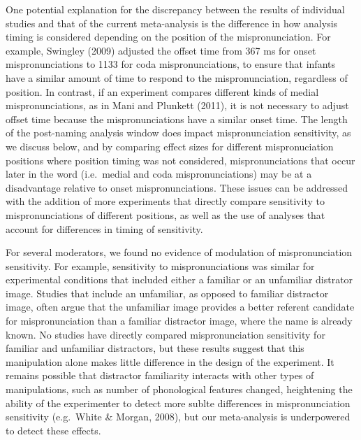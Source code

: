 \documentclass[man]{apa6}
\begin{document}
One potential explanation for the discrepancy between the results of individual studies and that of the current meta-analysis is the difference in how analysis timing is considered depending on the position of the mispronunciation. For example, Swingley (2009) adjusted the offset time from 367 ms for onset mispronunciations to 1133 for coda mispronunciations, to ensure that infants have a similar amount of time to respond to the mispronunciation, regardless of position. In contrast, if an experiment compares different kinds of medial mispronunciations, as in Mani and Plunkett (2011), it is not necessary to adjust offset time because the mispronunciations have a similar onset time. The length of the post-naming analysis window does impact mispronunciation sensitivity, as we discuss below, and by comparing effect sizes for different mispronuciation positions where position timing was not considered, mispronunciations that occur later in the word (i.e.~medial and coda mispronunciations) may be at a disadvantage relative to onset mispronunciations. These issues can be addressed with the addition of more experiments that directly compare sensitivity to mispronunciations of different positions, as well as the use of analyses that account for differences in timing of sensitivity.

For several moderators, we found no evidence of modulation of mispronunciation sensitivity. For example, sensitivity to mispronunciations was similar for experimental conditions that included either a familiar or an unfamiliar distrator image. Studies that include an unfamiliar, as opposed to familiar distractor image, often argue that the unfamiliar image provides a better referent candidate for mispronunciation than a familiar distractor image, where the name is already known. No studies have directly compared mispronunciation sensitivity for familiar and unfamiliar distractors, but these results suggest that this manipulation alone makes little difference in the design of the experiment. It remains possible that distractor familiarity interacts with other types of manipulations, such as number of phonological features changed, heightening the ability of the experimenter to detect more sublte differences in mispronunciation sensitivity (e.g.~White \& Morgan, 2008), but our meta-analysis is underpowered to detect these effects.
\end{document}

